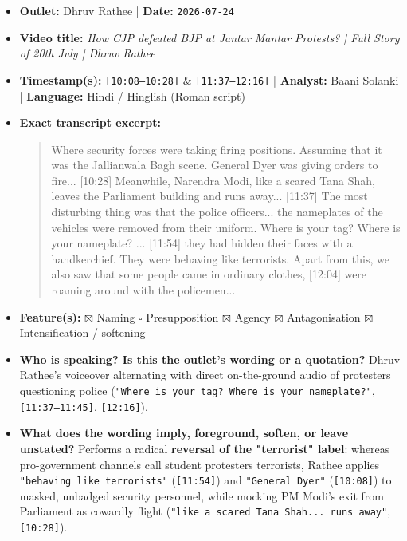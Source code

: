 \documentclass[10pt,a4paper]{article}
\begin{document}
\begin{itemize}[leftmargin=1.5em, itemsep=3pt, topsep=4pt]
  \item \textbf{Outlet:} Dhruv Rathee | \textbf{Date:} \texttt{2026-07-24}
  \item \textbf{Video title:} \textit{How CJP defeated BJP at Jantar Mantar Protests? | Full Story of 20th July | Dhruv Rathee}
  \item \textbf{Timestamp(s):} \texttt{[10:08--10:28]} \& \texttt{[11:37--12:16]} | \textbf{Analyst:} Baani Solanki | \textbf{Language:} Hindi / Hinglish (Roman script)
  \item \textbf{Exact transcript excerpt:}
    \begin{quote}\small\ttfamily [10:08] Where security forces were taking firing positions. Assuming that it was the Jallianwala Bagh scene. General Dyer was giving orders to fire... [10:28] Meanwhile, Narendra Modi, like a scared Tana Shah, leaves the Parliament building and runs away... [11:37] The most disturbing thing was that the police officers... the nameplates of the vehicles were removed from their uniform. Where is your tag? Where is your nameplate? ... [11:54] they had hidden their faces with a handkerchief. They were behaving like terrorists. Apart from this, we also saw that some people came in ordinary clothes, [12:04] were roaming around with the policemen...\end{quote}
  \item \textbf{Feature(s):} $\boxtimes$ Naming $\square$ Presupposition $\boxtimes$ Agency $\boxtimes$ Antagonisation $\boxtimes$ Intensification / softening
  \item \textbf{Who is speaking? Is this the outlet's wording or a quotation?} Dhruv Rathee's voiceover alternating with direct on-the-ground audio of protesters questioning police (\texttt{"Where is your tag? Where is your nameplate?"}, \texttt{[11:37--11:45]}, \texttt{[12:16]}).
  \item \textbf{What does the wording imply, foreground, soften, or leave unstated?} Performs a radical \textbf{reversal of the "terrorist" label}: whereas pro-government channels call student protesters terrorists, Rathee applies \texttt{"behaving like terrorists"} (\texttt{[11:54]}) and \texttt{"General Dyer"} (\texttt{[10:08]}) to masked, unbadged security personnel, while mocking PM Modi's exit from Parliament as cowardly flight (\texttt{"like a scared Tana Shah... runs away"}, \texttt{[10:28]}).

\end{itemize}
\end{document}
